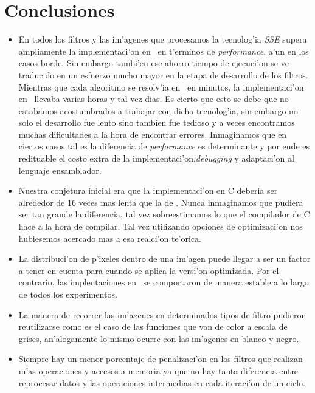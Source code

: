 \section{Conclusiones}
\label{sec:conclusiones}
\begin{itemize}
\item En todos los filtros y las im'agenes que procesamos la tecnolog'ia \textit{SSE} supera ampliamente la implementaci'on en \C \ en t'erminos de \textit{performance}, a'un en los casos borde. Sin embargo tambi'en ese ahorro tiempo de ejecuci'on se ve traducido en un esfuerzo mucho mayor en la etapa de desarrollo de los filtros. Mientras que cada algoritmo se resolv'ia en \C\ en minutos, la implementaci'on en \ass\ llevaba varias horas y tal vez dias. Es cierto que esto se debe que no estabamos acostumbrados a trabajar con dicha tecnolog'ia, sin embargo no solo el desarrollo fue lento sino tambien fue tedioso y a veces encontramos muchas dificultades a la hora de encontrar errores. Inmaginamos que en ciertos casos tal es la diferencia de \textit{performance} es determinante y por ende es redituable el costo extra de la implementaci'on,\textit{debugging} y adaptaci'on al lenguaje ensamblador.

\item Nuestra conjetura inicial era que la implementaci'on en C deberia ser alrededor de 16 veces mas lenta que la de \ass. Nunca inmaginamos que pudiera ser tan grande la diferencia, tal vez sobreestimamos lo que el compilador de C hace a la hora de compilar. Tal vez utilizando opciones de optimizaci'on nos hubiesemos acercado mas a esa realci'on te'orica.

\item La distribuci'on de p'ixeles dentro de una im'agen puede llegar a ser un factor a tener en cuenta para cuando se aplica la versi'on optimizada. Por el contrario, las implentaciones en \C\ se comportaron de manera estable a lo largo de todos los experimentos.

\item La manera de recorrer las im'agenes en determinados tipos de filtro pudieron reutilizarse como es el caso de las funciones que van de color 
a escala de grises, an'alogamente lo mismo ocurre con las im'agenes en blanco y negro.

\item Siempre hay un menor porcentaje de penalizaci'on en los filtros que realizan m'as operaciones y accesos a memoria ya que 
no hay tanta diferencia entre reprocesar datos y las operaciones intermedias en cada iteraci'on de un ciclo.


\end{itemize}
